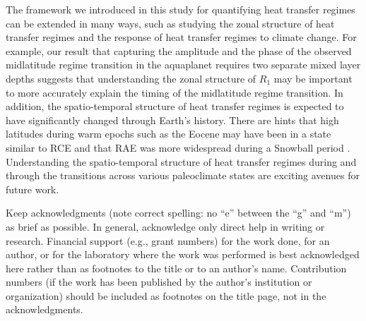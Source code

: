 \documentclass{ametsocV5}
\begin{document}
The framework we introduced in this study for quantifying heat transfer regimes can be extended in many ways, such as studying the zonal structure of heat transfer regimes and the response of heat transfer regimes to climate change. For example, our result that capturing the amplitude and the phase of the observed midlatitude regime transition in the aquaplanet requires two separate mixed layer depths suggests that understanding the zonal structure of $R_1$ may be important to more accurately explain the timing of the midlatitude regime transition. In addition, the spatio-temporal structure of heat transfer regimes is expected to have significantly changed through Earth's history. There are hints that high latitudes during warm epochs such as the Eocene may have been in a state similar to RCE \citep{abbot2008a} and that RAE was more widespread during a Snowball period \citep{pierrehumbert2005}. Understanding the spatio-temporal structure of heat transfer regimes during and through the transitions across various paleoclimate states are exciting avenues for future work.


\acknowledgments
Keep acknowledgments (note correct spelling: no ``e'' between the ``g'' and
``m'') as brief as possible. In general, acknowledge only direct help in
writing or research. Financial support (e.g., grant numbers) for the work
done, for an author, or for the laboratory where the work was performed is
best acknowledged here rather than as footnotes to the title or to an
author's name. Contribution numbers (if the work has been published by the
author's institution or organization) should be included as footnotes on the title page,
not in the acknowledgments.
\end{document}
